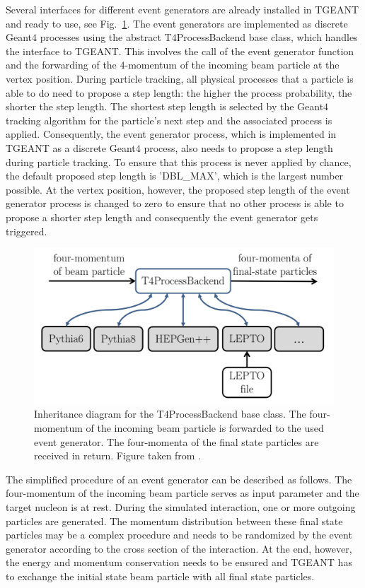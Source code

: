 Several interfaces for different event generators are already installed in TGEANT and ready to use, see Fig.~\ref{pic:Processbackend}. The event generators are implemented as discrete Geant$4$ processes using the abstract T$4$ProcessBackend base class, which handles the interface to TGEANT. This involves the call of the event generator function and the forwarding of the $4$-momentum of the incoming beam particle at the vertex position.
During particle tracking, all physical processes that a particle is able to do need to propose a step length: the higher the process probability, the shorter the step length. The shortest step length is selected by the Geant$4$ tracking algorithm for the particle’s next step and the associated process is applied. Consequently, the event generator process, which is implemented in TGEANT as a discrete Geant$4$ process, also needs to propose a step length during particle tracking. To ensure that this process is never applied by chance, the default proposed step length is 'DBL\_MAX', which is the largest number possible. At the vertex position, however, the proposed step length of the event generator process is changed to zero to ensure that no other process is able to propose a shorter step length and consequently the event generator gets triggered.

\begin{figure}[!h]
  \centering
	\includegraphics[scale=0.5]{./gfx/Processbackend.png}
	\caption{Inheritance diagram for the T$4$ProcessBackend base class. The four- momentum of the incoming beam particle is forwarded to the used event generator. The four-momenta of the final state particles are received in return. Figure taken from \cite{Tobias}.}
	\label{pic:Processbackend}
\end{figure}

The simplified procedure of an event generator can be described as follows. The four-momentum of the incoming beam particle serves as input parameter and the target nucleon is at rest. During the simulated interaction, one or more outgoing particles are generated. The momentum distribution between these final state particles may be a complex procedure and needs to be randomized by the event generator according to the cross section of the interaction. At the end, however, the energy and momentum conservation needs to be ensured and TGEANT has to exchange the initial state beam particle with all final state particles.


